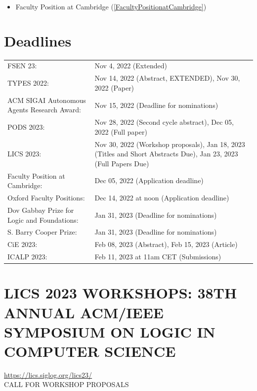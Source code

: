 \documentclass[prodmode,acmtecs]{acmsmall} %
\begin{document}
\begin{itemize}
\begin{itemize}\item Faculty Position at Cambridge (\cref{FacultyPositionatCambridge})
\end{itemize} 
\end{itemize}\section{Deadlines}\label{deadlines}\begin{tabulary}{\linewidth}{LL}FSEN 23:  & Nov 4, 2022 (Extended) \\
TYPES 2022:  & Nov 14, 2022 (Abstract, EXTENDED), Nov 30, 2022 (Paper) \\
ACM SIGAI Autonomous Agents Research Award:  & Nov 15, 2022 (Deadline for nominations) \\
PODS 2023:  & Nov 28, 2022 (Second cycle abstract), Dec 05, 2022 (Full paper) \\
LICS 2023:  & Nov 30, 2022 (Workshop proposals), Jan 18, 2023 (Titles and Short Abstracts Due), Jan 23, 2023 (Full Papers Due) \\
Faculty Position at Cambridge:  & Dec 05, 2022 (Application deadline) \\
Oxford Faculty Positions:  & Dec 14, 2022 at noon (Application deadline) \\
Dov Gabbay Prize for Logic and Foundations:  & Jan 31, 2023 (Deadline for nominations) \\
S. Barry Cooper Prize:  & Jan 31, 2023 (Deadline for nominations) \\
CiE 2023:  & Feb 08, 2023 (Abstract), Feb 15, 2023 (Article) \\
ICALP 2023:  & Feb 11, 2023 at 11am CET (Submissions) \\
\end{tabulary}
\section{LICS 2023 WORKSHOPS: 38TH ANNUAL ACM/IEEE SYMPOSIUM ON LOGIC IN COMPUTER SCIENCE}\label{LICS2023WORKSHOPS}  \href{https://lics.siglog.org/lics23/}{https://lics.siglog.org/lics23/}\\ 
CALL FOR WORKSHOP PROPOSALS 
\end{document}
